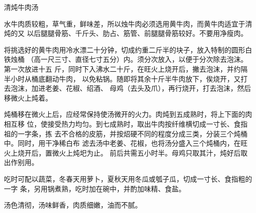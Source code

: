 \begin{recipe}{清炖牛肉汤}

\ingredients


\preparation

水牛肉质较粗，草气重，鲜味差，所以烛牛肉必须选用黄牛肉，而黄牛肉适宜于清炖的又
以后腿腿骨筋、千斤头、肋占、筋管、前腿腿骨筋较好。不要用净瘦肉。

将挑选好的黄牛肉用冷水漂二十分钟，切成约重二斤半的块子，放入特制的圆形白铁烛桶
（高一尺三寸、直径七寸五分）内。须分次放入，以便于分次除去泡沫。第一次放进十五
斤，同时下入沸水二十斤，在旺火上烧开后，撇去泡沫，并约隔半小时从桶底翻动牛肉，
以免粘锅。随即将其余十斤半牛肉放下，俟烧开，又打去泡沫，加进老姜、花椒、绍酒、
母鸡（去头及爪），再行烧开，打去泡沫，然后移微火上炖着。

炖桶移在微火上后，应经常保持使汤微开的火力。肉炖到五成熟时，将上下面的肉相互移
位，使接受热力均匀。到七成熟时，取出牛肉按纤维横切成一寸长、食指祖的一字条，拣
去不合格的皮筋，并按炤硬不同的程度分成三类，分装三个炖桶中。同时，用干净稀白布
滤去汤中老姜、花椒，也将汤分盛入三个炖桶内，在旺火上烧开后，置微火上炖圯为止。
前后共需五小时半。母鸡只取其汁，炖好后取出作别用。

吃时可配以蔬菜，冬春天用萝卜，夏秋天用冬瓜或瓠子瓜，切成一寸长、食指粗的一字
条，另用锅煮熟，吃时加在碗中，并酌加味精、食盐。

\features

汤色清彻，汤味鲜香，肉质细嫩，油而不腻。

\end{recipe}

